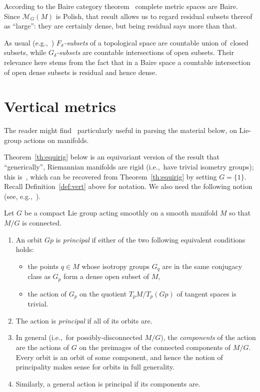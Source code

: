 \documentclass[pdftex]{sigma}%
\numberwithin{equation}{section}
\begin{document}
According to the Baire category theorem~\cite[Theorem~11.7.2]{nb} complete metric spaces are Baire. Since $\mathcal{M}_G(M)$ is Polish, that result allows us to regard residual subsets thereof as ``large'': they are certainly dense, but being residual says more than that.

As usual (e.g.,~\cite[Section~1.3]{eng-top}) {\it $F_{\sigma}$-subsets} of a topological space are countable union of~clo\-sed subsets, while {\it $G_{\delta}$-subsets} are countable intersections of open subsets. Their relevance here stems from the fact that in a Baire space a countable intersection of open dense subsets is residual and hence dense.

\section{Vertical metrics}\label{se:vert}

The reader might find~\cite{mb-gps,bred-gps,kob-gps} particularly useful in parsing the material below, on Lie-group actions on manifolds.

Theorem~\ref{th:equirig} below is an equivariant version of the result that ``generically'', Riemannian manifolds are rigid (i.e.,~have trivial isometry groups); this is~\cite[Proposition~8.3]{eb}, which can be recovered from Theorem~\ref{th:equirig} by setting $G=\{1\}$. Recall Definition~\ref{def:vert} above for notation. We also need the following notion (see, e.g.,~\cite[Proposition~I.2.5 and the discussion following it, and Remark I.2.7]{aud}).

\begin{Definition}\label{def:princ}
 Let $G$ be a compact Lie group acting smoothly on a smooth manifold $M$ so that $M/G$ is connected.
 \begin{enumerate}[($a$)]\itemsep=0pt
 \item An orbit $Gp$ is {\it principal} if either of the two following equivalent conditions holds:
 \begin{itemize}\itemsep=0pt
 \item the points $q\in M$ whose isotropy groups $G_q$ are in the same conjugacy class as $G_p$ form a dense open subset of $M$,
 \item the action of $G_p$ on the quotient $T_pM/T_p(Gp)$ of tangent spaces is trivial.
 \end{itemize}
 \item The action is {\it principal} if all of its orbits are.
 \item In general (i.e.,~for possibly-disconnected $M/G$), the {\it components} of the action are the actions of $G$ on the preimages of the connected components of $M/G$. Every orbit is an orbit of some component, and hence the notion of principality makes sense for orbits in full generality.
 \item Similarly, a general action is principal if its components are.
 \end{enumerate}
\end{Definition}
\end{document}

